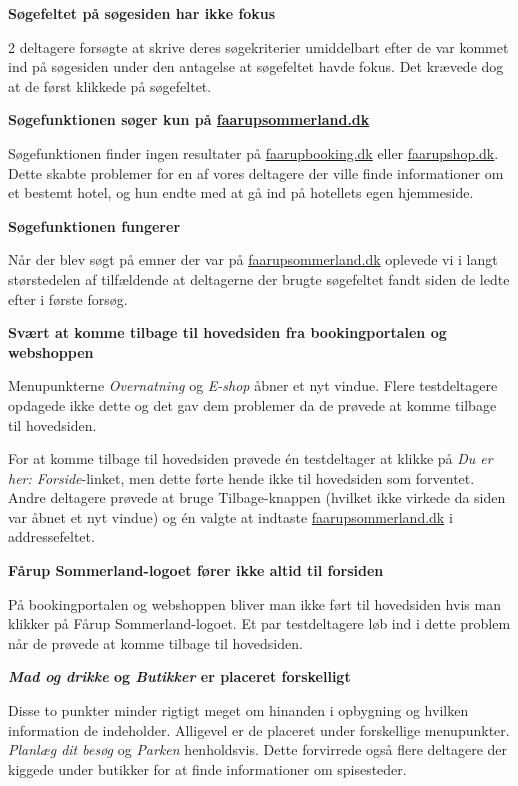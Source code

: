 \documentclass[10pt,a4paper]{article}      %
\newcommand\pic[1]{\texttt{[image: Pics/\#1]}}
\renewcommand\good{\pic{good}}
\renewcommand\smallproblem{\pic{smallproblem}}
\renewcommand\seriousproblem{\pic{seriousproblem}}
\begin{document}
\begin{kommentarer}
\item[\smallproblem]{\textbf{Søgefeltet på søgesiden har ikke fokus}}

2 deltagere forsøgte at skrive deres søgekriterier umiddelbart efter de var
kommet ind på søgesiden under den antagelse at søgefeltet havde fokus. Det
krævede dog at de først klikkede på søgefeltet.

\item[\seriousproblem]{\textbf{Søgefunktionen søger kun på \url{faarupsommerland.dk}}}

Søgefunktionen finder ingen resultater på \url{faarupbooking.dk}
eller \url{faarupshop.dk}. Dette skabte problemer for en af vores deltagere der ville
finde informationer om et bestemt hotel, og hun endte med at gå ind på hotellets
egen hjemmeside.

\item[\good]{\textbf{Søgefunktionen fungerer}}

Når der blev søgt på emner der var på \url{faarupsommerland.dk} oplevede vi i langt
størstedelen af tilfældende at deltagerne der brugte søgefeltet fandt siden de
ledte efter i første forsøg.

\item[\smallproblem]{\textbf{Svært at komme tilbage til hovedsiden fra bookingportalen og webshoppen}}

Menupunkterne \emph{Overnatning} og \emph{E-shop} åbner et nyt vindue. Flere testdeltagere
opdagede ikke dette og det gav dem problemer da de prøvede at komme tilbage til hovedsiden.

For at komme tilbage til hovedsiden prøvede én testdeltager at klikke på
\emph{Du er her: Forside}-linket, men dette førte hende ikke til hovedsiden som
forventet. Andre deltagere prøvede at bruge Tilbage-knappen (hvilket ikke
virkede da siden var åbnet et nyt vindue) og én valgte at indtaste
\url{faarupsommerland.dk} i addressefeltet.

\item[\smallproblem]{\textbf{Fårup Sommerland-logoet fører ikke altid til forsiden}}

På bookingportalen og webshoppen bliver man ikke ført til hovedsiden hvis man
klikker på Fårup Sommerland-logoet. Et par testdeltagere løb ind i dette problem
når de prøvede at komme tilbage til hovedsiden.

\item[\smallproblem] \textbf{\emph{Mad og drikke} og \emph{Butikker} er placeret forskelligt}

Disse to punkter minder rigtigt meget om hinanden i opbygning og hvilken
information de indeholder. Alligevel er de placeret under forskellige
menupunkter. \emph{Planlæg dit besøg} og \emph{Parken} henholdsvis. Dette
forvirrede også flere deltagere der kiggede under butikker for at finde
informationer om spisesteder.

\end{kommentarer}
\end{document}
